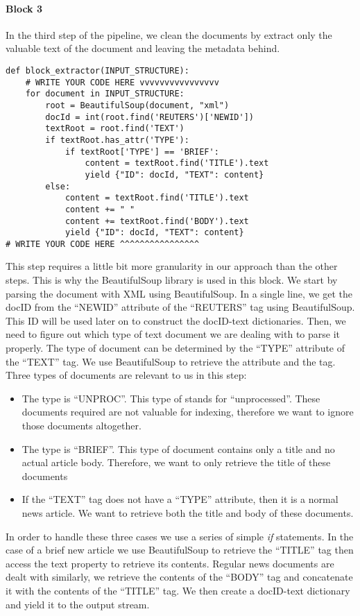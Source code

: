 \documentclass[]{report}
\begin{document}
\paragraph{Block 3}
In the third step of the pipeline, we clean the documents by extract only the valuable text of the document and leaving the metadata behind.
\begin{verbatim}
def block_extractor(INPUT_STRUCTURE):
	# WRITE YOUR CODE HERE vvvvvvvvvvvvvvvv
	for document in INPUT_STRUCTURE:
		root = BeautifulSoup(document, "xml")
		docId = int(root.find('REUTERS')['NEWID'])
		textRoot = root.find('TEXT')
		if textRoot.has_attr('TYPE'):
			if textRoot['TYPE'] == 'BRIEF':
				content = textRoot.find('TITLE').text
				yield {"ID": docId, "TEXT": content}
		else:
			content = textRoot.find('TITLE').text
			content += " "
			content += textRoot.find('BODY').text
			yield {"ID": docId, "TEXT": content}
# WRITE YOUR CODE HERE ^^^^^^^^^^^^^^^^
\end{verbatim}
This step requires a little bit more granularity in our approach than the other steps. This is why the BeautifulSoup library is used in this block. We start by parsing the document with XML using BeautifulSoup. In a single line, we get the docID from the ``NEWID'' attribute of the ``REUTERS'' tag using BeautifulSoup. This ID will be used later on to construct the docID-text dictionaries. Then, we need to figure out which type of text document we are dealing with to parse it properly. The type of document can be determined by the ``TYPE'' attribute of the ``TEXT'' tag. We use BeautifulSoup to retrieve the attribute and the tag. Three types of documents are relevant to us in this step:
\begin{itemize}
	\item The type is ``UNPROC''. This type of stands for ``unprocessed''. These documents required are not valuable for indexing, therefore we want to ignore those documents altogether.
	\item The type is ``BRIEF''. This type of document contains only a title and no actual article body. Therefore, we want to only retrieve the title of these documents
	\item If the ``TEXT'' tag does not have a ``TYPE'' attribute, then it is a normal news article. We want to retrieve both the title and body of these documents.
\end{itemize}
In order to handle these three cases we use a series of simple \textit{if} statements. In the case of a brief new article we use BeautifulSoup to retrieve the ``TITLE'' tag then access the text property to retrieve its contents. Regular news documents are dealt with similarly, we retrieve the contents of the ``BODY'' tag and concatenate it with the contents of the ``TITLE'' tag. We then create a docID-text dictionary and yield it to the output stream.
\end{document}
